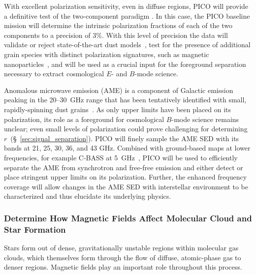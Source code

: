 \documentclass[PICOReport.tex]{subfiles}
\begin{document}
With excellent polarization sensitivity, even in diffuse regions, PICO will provide a definitive test of the two-component paradigm \citep{Meisner2015}. 
In this case, the PICO baseline mission will determine the intrinsic polarization fractions of each of the two components to a precision of 3\%. With this level of precision the data will validate or reject state-of-the-art dust models~\citep[e.g.][]{Draine2009,Guillet2018}, test for the presence of additional grain species with distinct polarization signatures, such as magnetic nanoparticles~\citep{Draine2013}, and will be used as a crucial input for the foreground separation necessary to extract cosmological $E$- and $B$-mode science. 

Anomalous microwave emission (AME) is a component of Galactic emission peaking in the 20--30~GHz range that has been tentatively identified with small, rapidly-spinning dust grains~\citep{dickinson/etal:2018}. As only upper limits have been placed on its polarization, its role as a foreground for cosmological $B$-mode science remains unclear; even small levels of polarization could prove challenging for determining $r$~(\S~\ref{sec:signal_separation}). PICO will finely sample the AME SED with its bands at 21, 25, 30, 36, and 43 GHz. Combined with ground-based maps at lower frequencies, for example C-BASS at 5~GHz~\citep{Dickinson2018a}, PICO will be used to efficiently separate the AME from synchrotron and free-free emission and either detect or place stringent upper limits on its polarization. Further, the enhanced frequency coverage will allow changes in the AME SED with interstellar environment to be characterized and thus elucidate its underlying physics.

\subsubsection{Determine How Magnetic Fields Affect Molecular Cloud and Star Formation}
\label{sec:magnetic_fields}

Stars form out of dense, gravitationally unstable regions within molecular gas clouds, which themselves form through the flow of diffuse, atomic-phase gas to denser regions. Magnetic fields play an important role throughout this process. 
\end{document}
